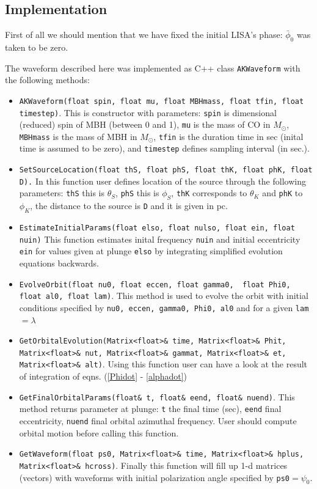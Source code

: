 \documentclass[11pt]{report}
\begin{document}
\subsection{Implementation}

First of all we should mention that we have fixed the initial LISA's 
phase: $\bar{\phi}_0$ was taken to be zero.

The waveform described here was implemented as C++ class 
{\tt AKWaveform} with the following methods:
\begin{itemize}
\item {\tt AKWaveform(float spin, float mu, float MBHmass, float tfin, float timestep)}. This is constructor with parameters: {\tt spin}  is dimensional (reduced) spin of MBH (between 0 and 1), {\tt mu} is the mass of CO in $M_{\odot}$, {\tt MBHmass} is the mass of MBH
in $M_{\odot}$, {\tt tfin} is the duration time in sec (inital time is assumed to be zero), and {\tt timestep} defines sampling interval 
(in sec.). 
\item {\tt SetSourceLocation(float thS, float phS,  float thK, float phK, float D).} In this function user defines location of the source through
the following parameters: {\tt thS} this is $\theta_S$, {\tt phS}
this is $\phi_S$, {\tt thK} corresponds to $\theta_K$ and 
{\tt phK} to $\phi_K$, the distance to the source is {\tt D} and
it is given in pc.

\item {\tt EstimateInitialParams(float elso, float nulso, float ein, 
float nuin)}
This function estimates inital frequency {\tt nuin} and initial
eccentricity {\tt ein} for values given at plunge {\tt elso}
by integrating simplified evolution equations backwards.

\item {\tt EvolveOrbit(float nu0, float eccen, float gamma0, \
		    float Phi0, float al0, float lam)}. This method is used 
to evolve the orbit with initial conditions specified by 
{\tt nu0, eccen, gamma0, Phi0, al0} and for a given {\tt lam} 
$= \lambda$ 

\item {\tt GetOrbitalEvolution(Matrix<float>\& time, Matrix<float>\& Phit, Matrix<float>\& nut,  Matrix<float>\& gammat, Matrix<float>\& et, Matrix<float>\& alt)}. Using this function user can have a look at the result of integration of eqns. (\ref{Phidot} - \ref{alphadot})

\item {\tt GetFinalOrbitalParams(float\& t, float\& eend, float\& nuend)}.
This method returns parameter at plunge: {\tt t} the final time (sec),
{\tt eend} final eccentricity, {\tt nuend} final orbital azimuthal frequency.
User should compute orbital motion before calling this function. 

\item {\tt GetWaveform(float ps0, Matrix<float>\& time, Matrix<float>\& hplus,  Matrix<float>\& hcross)}. Finally this function will 
fill up 1-d matrices (vectors) with waveforms with initial 
polarization angle specified by {\tt ps0}$= \psi_0$.
\end{itemize}
\end{document}
